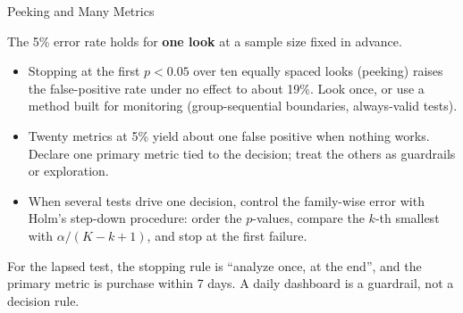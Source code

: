 \documentclass[aspectratio=169, 11pt, handout]{beamer}
\begin{document}
\begin{frame}{Peeking and Many Metrics}

The 5\% error rate holds for \textbf{one look} at a sample size fixed in advance.

\begin{itemize}
  \item Stopping at the first $p < 0.05$ over ten equally spaced looks (peeking) raises the false-positive rate under no effect to about 19\%. Look once, or use a method built for monitoring (group-sequential boundaries, always-valid tests).
  \item Twenty metrics at 5\% yield about one false positive when nothing works. Declare one primary metric tied to the decision; treat the others as guardrails or exploration.
  \item When several tests drive one decision, control the family-wise error with Holm's step-down procedure: order the $p$-values, compare the $k$-th smallest with $\alpha/(K - k + 1)$, and stop at the first failure.
\end{itemize}

\bigskip

\small For the lapsed test, the stopping rule is ``analyze once, at the end'', and the primary metric is purchase within 7 days. A daily dashboard is a guardrail, not a decision rule.
\end{frame}
\end{document}
